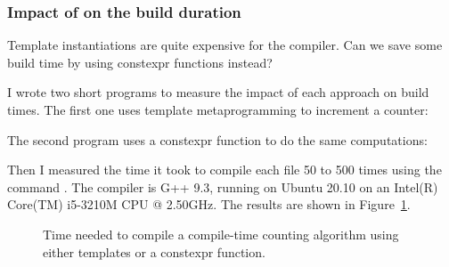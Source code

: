 \subsubsection{Impact of  on the build duration}

Template instantiations are quite expensive for the compiler. Can we
save some build time by using constexpr functions instead?

I wrote two short programs to measure the impact of each approach on
build times. The first one uses template metaprogramming to increment
a counter:



The second program uses a constexpr function to do the same
computations:



Then I measured the time it took to compile each file 50 to 500
times using the command . The compiler is G++ 9.3, running on Ubuntu 20.10 on an
Intel(R) Core(TM) i5-3210M CPU @ 2.50GHz. The results are shown in
Figure~\ref{fig:constexpr-benchmark}.

\begin{figure}
  \centering
  \caption{Time needed to compile a compile-time counting algorithm
    using either templates or a constexpr function.}
  \label{fig:constexpr-benchmark}
\end{figure}
